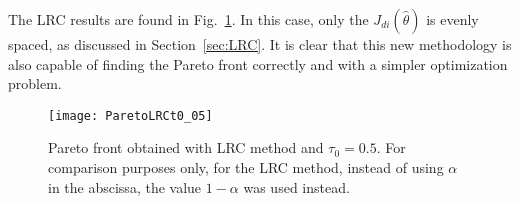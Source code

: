 The LRC results are found in Fig.~\ref{fig:ParetoLRCt0_05}. In this case, only the $J_{di}(\hat{\theta})$ is evenly spaced, as discussed in Section~\ref{sec:LRC}. It is clear that this new methodology is also capable of finding the Pareto front correctly and with a simpler optimization problem.
\begin{figure}%
	\centering
	\texttt{[image: ParetoLRCt0\_05]}%
	\caption{Pareto front obtained with LRC method and $\tau_0=0.5$. For comparison purposes only, for the LRC method, instead of using $\alpha$ in the abscissa, the value $1-\alpha$ was used instead.}%
	\label{fig:ParetoLRCt0_05}%
\end{figure}




